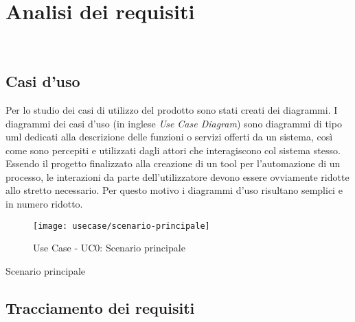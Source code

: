 
\chapter{Analisi dei requisiti}
\label{cap:analisi-requisiti}

\\

\section{Casi d'uso}

Per lo studio dei casi di utilizzo del prodotto sono stati creati dei diagrammi.
I diagrammi dei casi d'uso (in inglese \emph{Use Case Diagram}) sono diagrammi di tipo \gls{uml} dedicati alla descrizione delle funzioni o servizi offerti da un sistema, così come sono percepiti e utilizzati dagli attori che interagiscono col sistema stesso.
Essendo il progetto finalizzato alla creazione di un tool per l'automazione di un processo, le interazioni da parte dell'utilizzatore devono essere ovviamente ridotte allo stretto necessario. Per questo motivo i diagrammi d'uso risultano semplici e in numero ridotto.

\begin{figure}[!h] 
    \centering 
    \texttt{[image: usecase/scenario-principale]} 
    \caption{Use Case - UC0: Scenario principale}
\end{figure}

\begin{usecase}{0}{Scenario principale}
\label{uc:scenario-principale}
\end{usecase}

\section{Tracciamento dei requisiti}

